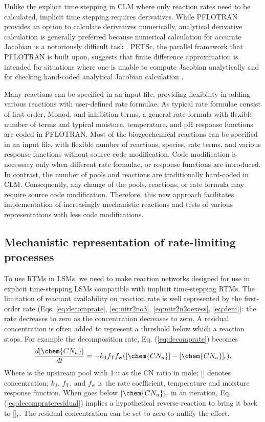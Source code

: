 \documentclass[gmd, manuscript]{copernicus}
\begin{document}
Unlike the explicit time stepping in CLM where only  reaction rates need to be calculated, implicit time stepping requires derivatives.  While PFLOTRAN
provides an option to calculate derivatives numerically, analytical derivative calculation is generally preferred \citep[e.g.,][]{Xu2006} because numerical calculation for accurate Jacobian is a notoriously difficult task \citep{Shampine2005}. PETSc, the parallel framework that PFLOTRAN is built upon, suggests that finite difference approximation is intended for situations where one is unable to compute Jacobian analytically and for checking hand-coded analytical Jacobian calculation \citep{Balay2015}.  

Many reactions can be specified in an input file, providing flexibility in adding various reactions with user-defined rate formulae. As typical rate formulae consist of first order, Monod, and inhibition terms, a general rate formula with flexible number of terms and typical moisture, temperature, and pH response functions are coded in PFLOTRAN. Most of the biogeochemical reactions can be specified in an input file, with flexible number of reactions, species, rate terms, and various response functions without source code modification. Code modification is necessary only when different rate formulae, or response
functions are introduced. In contrast, the number of pools and reactions are traditionally hard-coded in CLM. Consequently, any change of the pools,
reactions, or rate formula may require source code modification. Therefore, this new approach facilitates implementation of increasingly mechanistic reactions
and tests of various representations with less code modifications.

\subsection{Mechanistic representation of rate-limiting processes}
To use RTMs in LSMs, we need to make reaction networks designed for use in explicit time-stepping LSMs compatible with implicit time-stepping RTMs. The limitation of reactant availability on reaction rate is well represented by the first-order rate (Eqs. \ref{eq:decomprate}, \ref{eq:nitr2no3}, \ref{eq:nitr2n2oexess}, \ref{eq:deni}): the rate decreases to zero as the concentration decreases to zero. A residual concentration is often added to represent a threshold below which a reaction stops. For example the decomposition rate, Eq. (\ref{eq:decomprate}) becomes
\begin{equation}
\frac{d [\chem{CN_u}]}{d t} = -k_\text{d} f_\text{T} f_\text{w}
([\chem{CN_u}] - [\chem{CN_u}]_\text{r}).
\label{eq:decomprateresidual}
\end{equation}
Where  is the upstream pool with 1:u as the CN ratio in mole; [] denotes concentration; $k_\text{d}$, $f_\text{T}$, and $f_\text{w}$ is the rate coefficient, temperature and moisture response function. When  goes below $[\chem{CN_u}]_\text{r}$ in an iteration, Eq. (\ref{eq:decomprateresidual}) implies a hypothetical reverse reaction to bring it back to []$_\text{r}$. The residual concentration can be set to zero to nullify the effect.  
\end{document}
